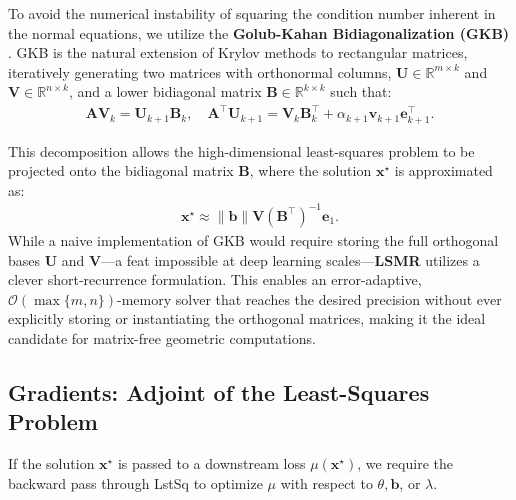 To avoid the numerical instability of squaring the condition number inherent in the normal equations, we utilize the \textbf{Golub-Kahan Bidiagonalization (GKB)} \citep{golub1965calculating}. GKB is the natural extension of Krylov methods to rectangular matrices, iteratively generating two matrices with orthonormal columns, $\mathbf{U} \in \mathbb{R}^{m \times k}$ and $\mathbf{V} \in \mathbb{R}^{n \times k}$, and a lower bidiagonal matrix $\mathbf{B} \in \mathbb{R}^{k \times k}$ such that:
\begin{align}
\mathbf{A} \mathbf{V}_k = \mathbf{U}_{k+1} \mathbf{B}_k, \quad \mathbf{A}^\top \mathbf{U}_{k+1} = \mathbf{V}_k \mathbf{B}_k^\top + \alpha_{k+1} \mathbf{v}_{k+1} \mathbf{e}_{k+1}^\top.
\end{align}



This decomposition allows the high-dimensional least-squares problem to be projected onto the bidiagonal matrix $\mathbf{B}$, where the solution $\mathbf{x}^\star$ is approximated as:
\begin{align}\label{equation-bidiagonalization-for-lstsq}
\mathbf{x}^\star \approx \|\mathbf{b}\| \mathbf{V} (\mathbf{B}^\top)^{-1} \mathbf{e}_1.
\end{align}
While a naive implementation of GKB would require storing the full orthogonal bases $\mathbf{U}$ and $\mathbf{V}$—a feat impossible at deep learning scales—\textbf{LSMR} utilizes a clever short-recurrence formulation. This enables an error-adaptive, $\mathcal{O}(\max\{m, n\})$-memory solver that reaches the desired precision without ever explicitly storing or instantiating the orthogonal matrices, making it the ideal candidate for matrix-free geometric computations.\subsection{Gradients: Adjoint of the Least-Squares Problem}

If the solution $\mathbf{x}^\star$ is passed to a downstream loss $\mu(\mathbf{x}^\star)$, we require the backward pass through \textsf{LstSq} to optimize $\mu$ with respect to $\theta, \mathbf{b}$, or $\lambda$. 

